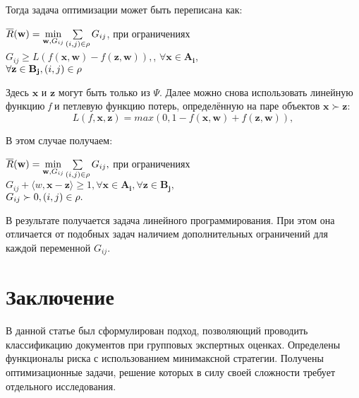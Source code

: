 \documentclass[12pt,a4paper,oneside]{article}
\begin{document}
\begin{multicols}{2}
\par
Тогда задача оптимизации может быть переписана как:
\begin{center}
\(\overline{R}(\mathbf{w}) = \underset{\mathbf{w}, G_{ij}}{\operatorname{min}} \sum \limits_{(i, j) \in \mathrm{\rho}} G_{ij}\), при ограничениях\\
\(G_{ij} \geq L (f(\mathbf{x}, \mathbf{w}) - f(\mathbf{z}, \mathbf{w})), 
\), \(\forall \mathbf{x} \in \mathbf{A_i}\),\\
\(\forall \mathbf{z} \in \mathbf{B_j}, (i, j) \in \mathrm{\rho}\)
\end{center}

\par
Здесь \(\mathbf{x}\) и \(\mathbf{z}\) могут быть только из \(\Psi\). 
Далее можно снова использовать линейную функцию \emph{f} и петлевую функцию потерь, определённую на паре объектов \(\mathbf{x} \succ \mathbf{z}\):
\[
L(f, \mathbf{x}, \mathbf{z}) = max (0,1 - f(\mathbf{x}, \mathbf{w}) + f(\mathbf{z}, \mathbf{w})),
\]

В этом случае получаем:
\begin{center}
\(\overline{R}(\mathbf{w}) = \underset{\mathbf{w}, G_{ij}}{\operatorname{min}} \sum \limits_{(i, j) \in \mathrm{\rho}} G_{ij},\) при ограничениях\\
\(G_{ij} + \langle w, \mathbf{x} - \mathbf{z} \rangle \geq 1, \forall \mathbf{x} \in \mathbf{A_i}, \forall \mathbf{z} \in \mathbf{B_j}, \)\\
\(G_{ij} \succ 0, (i, j) \in \mathrm{\rho}.\)
\end{center}

\par
В результате получается задача линейного программирования. 
При этом она отличается от подобных задач наличием дополнительных ограничений для каждой переменной \(G_{ij}\). 


\vspace*{1em}
\chapter{Заключение}

\par
В данной статье был сформулирован подход, позволяющий проводить классификацию документов при групповых экспертных оценках. 
Определены функционалы риска с использованием минимаксной стратегии. 
Получены оптимизационные задачи, решение которых в силу своей сложности требует отдельного исследования. 


\end{multicols}
\end{document}
